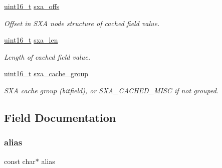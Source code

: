 \begin{DoxyCompactItemize}
\mbox{\label{struct__xbee__reg__descr__t_acfa39348dc06ee8b25af49145a003e23}} 
\hyperlink{group__hal__dos_ga5a8b2dc9e45a9ee81a94ef304fb62505}{uint16\+\_\+t} \hyperlink{struct__xbee__reg__descr__t_acfa39348dc06ee8b25af49145a003e23}{sxa\+\_\+offs}
\begin{DoxyCompactList}\small\item\em Offset in S\+XA node structure of cached field value. \end{DoxyCompactList}\item 
\mbox{\label{struct__xbee__reg__descr__t_afffefbb55b7d4e0f2932567b30161167}} 
\hyperlink{group__hal__dos_ga5a8b2dc9e45a9ee81a94ef304fb62505}{uint16\+\_\+t} \hyperlink{struct__xbee__reg__descr__t_afffefbb55b7d4e0f2932567b30161167}{sxa\+\_\+len}
\begin{DoxyCompactList}\small\item\em Length of cached field value. \end{DoxyCompactList}\item 
\mbox{\label{struct__xbee__reg__descr__t_a4ef83a005ab7c0854ce2de3973b2a3df}} 
\hyperlink{group__hal__dos_ga5a8b2dc9e45a9ee81a94ef304fb62505}{uint16\+\_\+t} \hyperlink{struct__xbee__reg__descr__t_a4ef83a005ab7c0854ce2de3973b2a3df}{sxa\+\_\+cache\+\_\+group}
\begin{DoxyCompactList}\small\item\em S\+XA cache group (bitfield), or S\+X\+A\+\_\+\+C\+A\+C\+H\+E\+D\+\_\+\+M\+I\+SC if not grouped. \end{DoxyCompactList}\end{DoxyCompactItemize}


\subsection{Field Documentation}
\mbox{\label{struct__xbee__reg__descr__t_aae877041546563a319dff9e25bc3aaf7}} 
\subsubsection{\texorpdfstring{alias}{alias}}
{\footnotesize\ttfamily const char$\ast$ alias}



